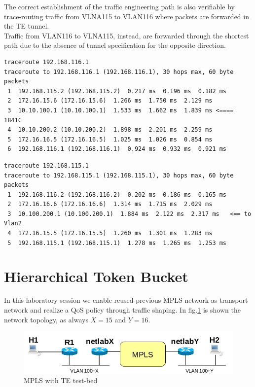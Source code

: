 \documentclass{llncs}
\newcommand{\labelsec}[1]{\label{sec:#1}}
\begin{document}
The correct establishment of the traffic engineering path is also verifiable by trace-routing traffic from VLNA115 to VLAN116 where packets are forwarded in the TE tunnel.\\
Traffic from VLAN116 to VLNA115, instead, are forwarded through the shortest path due to the absence of tunnel specification for the opposite direction.

\lstset{language=sh, caption=Traceroute from VLNA115 to VLAN116 after TE, basicstyle=\ttfamily\scriptsize , breaklines=true}
\begin{lstlisting}
traceroute 192.168.116.1
traceroute to 192.168.116.1 (192.168.116.1), 30 hops max, 60 byte packets
 1  192.168.115.2 (192.168.115.2)  0.217 ms  0.196 ms  0.182 ms
 2  172.16.15.6 (172.16.15.6)  1.266 ms  1.750 ms  2.129 ms
 3  10.10.100.1 (10.10.100.1)  1.533 ms  1.662 ms  1.839 ms	<==== 1841C 
 4  10.10.200.2 (10.10.200.2)  1.898 ms  2.201 ms  2.259 ms
 5  172.16.16.5 (172.16.16.5)  1.025 ms  1.026 ms  0.854 ms
 6  192.168.116.1 (192.168.116.1)  0.924 ms  0.932 ms  0.921 ms
\end{lstlisting}

\lstset{language=sh, caption=Traceroute from VLNA116 to VLAN115 after TE, basicstyle=\ttfamily\scriptsize , breaklines=true}
\begin{lstlisting}
traceroute 192.168.115.1
traceroute to 192.168.115.1 (192.168.115.1), 30 hops max, 60 byte packets
 1  192.168.116.2 (192.168.116.2)  0.202 ms  0.186 ms  0.165 ms
 2  172.16.16.6 (172.16.16.6)  1.314 ms  1.715 ms  2.029 ms
 3  10.100.200.1 (10.100.200.1)  1.884 ms  2.122 ms  2.317 ms 	<== to Vlan2
 4  172.16.15.5 (172.16.15.5)  1.260 ms  1.301 ms  1.283 ms
 5  192.168.115.1 (192.168.115.1)  1.278 ms  1.265 ms  1.253 ms
\end{lstlisting}
\newpage
\section{Hierarchical Token Bucket}
\labelsec{HTB_ts}

In this laboratory session we enable reused previous MPLS network as transport network and realize a QoS policy through traffic shaping. In fig.\ref{fig:qos_topology} is shown the network topology, as always $X=15$ and $Y=16$. 

\begin{figure}
\centering
\includegraphics[width=1.0\textwidth]{../e6/topology.png}
\caption{MPLS with TE test-bed}
\label{fig:qos_topology}
\end{figure}
\end{document}
